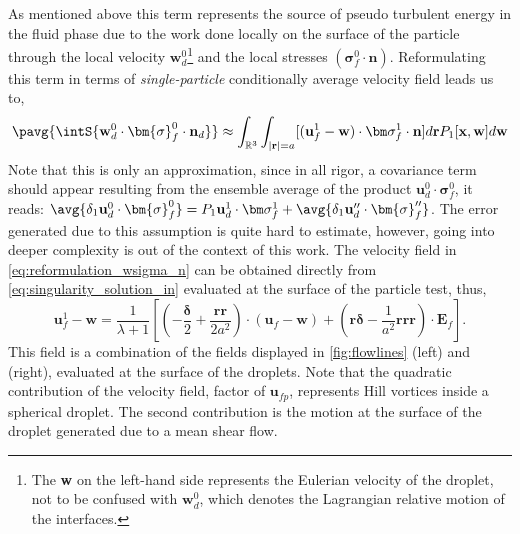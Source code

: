 As mentioned above this term represents the source of pseudo turbulent energy in the fluid phase due to the work done locally on the surface of the particle through the local velocity $\textbf{w}_d^0$\footnote{The \textbf{w} on the left-hand side represents the Eulerian velocity of the droplet, not to be confused with $\textbf{w}_d^0$, which denotes the Lagrangian relative motion of the interfaces.} and the local stresses $(\bm\sigma_f^0 \cdot \textbf{n})$.
Reformulating this term in terms of \textit{single-particle} conditionally average velocity field leads us to, 
\begin{equation}
    \pavg{ \intS{\textbf{w}_d^0 \cdot \bm{\sigma}_f^0 \cdot \textbf{n}_d}}
    \approx
    \int_{\mathbb{R}^3} \int_{|\textbf{r}| = a}
    [(\textbf{u}^1_f - \textbf{w})\cdot \bm\sigma_f^1\cdot \textbf{n} ]
    d\textbf{r}
    P_1[\textbf{x},\textbf{w}]
    d\textbf{w} 
    \label{eq:reformulation_wsigma_n}
\end{equation} 
Note that this is only an approximation, since in all rigor, a covariance term should appear resulting from the ensemble average of the product $\textbf{u}_d^0 \cdot \bm{\sigma}_f^0$, it reads: $\avg{\delta_1 \textbf{u}_d^0 \cdot \bm{\sigma}_f^0} = P_1 \textbf{u}_d^1 \cdot  \bm\sigma_f^1 + \avg{\delta_1 \textbf{u}_d'' \cdot \bm{\sigma}_f''} $. 
The error generated due to this assumption is quite hard to estimate, however, going into deeper complexity is out of the context of this work. 
The velocity field in \ref{eq:reformulation_wsigma_n} can be obtained directly from \ref{eq:singularity_solution_in}  evaluated at the surface of the particle test, thus,
\begin{equation*}
    \textbf{u}^1_f - \textbf{w}
    = 
    \frac{1}{\lambda +1} \left[\left(
        -\frac{\bm\delta}{2}
        + 
        \frac{\textbf{rr}}{2a^2}
    \right)\cdot (\textbf{u}_{f} - \textbf{w}) 
    + \left(\textbf{r}\bm\delta
    -\frac{1}{a^2}\textbf{rrr}\right)\cdot \textbf{E}_f
    \right].
\end{equation*}
This field is a combination of the fields displayed in \ref{fig:flowlines} (left) and (right), evaluated at the surface of the droplets. 
Note that the quadratic contribution of the velocity field, factor of $\textbf{u}_{fp}$, represents Hill vortices inside a spherical droplet. 
The second contribution is the motion at the surface of the droplet generated due to a mean shear flow. 

